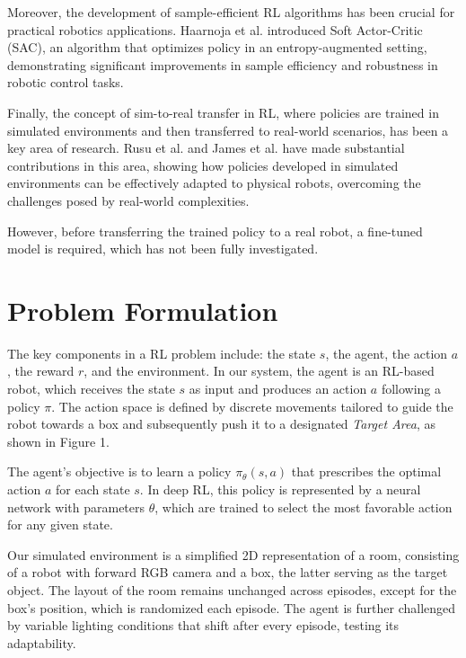 \documentclass{article}
\newcommand{\nat}[1]{\textcolor{orange}{N: #1}}
\begin{document}
Moreover, the development of sample-efficient RL algorithms has been crucial for practical robotics applications. Haarnoja et al. \cite{haarnoja2018soft} introduced Soft Actor-Critic (SAC), an algorithm that optimizes policy in an entropy-augmented setting, demonstrating significant improvements in sample efficiency and robustness in robotic control tasks.

Finally, the concept of sim-to-real transfer in RL, where policies are trained in simulated environments and then transferred to real-world scenarios, has been a key area of research. Rusu et al. \cite{rusu2017sim} and James et al. \cite{james2019sim} have made substantial contributions in this area, showing how policies developed in simulated environments can be effectively adapted to physical robots, overcoming the challenges posed by real-world complexities.

However, before transferring the trained policy to a real robot, a fine-tuned model is required, which has not been fully investigated.



\section{Problem Formulation}\label{ref:experiments}
The key components in a RL problem include: the state \( s \), the agent, the action \( a \), the reward \( r \), and  the environment. In our system, the agent is an RL-based robot, which receives the state \( s \) as input and produces an action \( a \) following a policy \( \pi \). The action space is defined by discrete movements tailored to guide the robot towards a box and subsequently push it to a designated \textit{Target Area}, as shown in Figure 1.

The agent's objective is to learn a policy \( \pi_\theta(s,a) \) that prescribes the optimal action \( a \) for each state \( s \). In deep RL, this policy is represented by a neural network with parameters \( \theta \), which are trained to select the most favorable action for any given state.

Our simulated environment is a simplified 2D representation of a room, consisting of a robot with forward RGB camera and a box, the latter serving as the target object. The layout of the room remains unchanged across episodes, except for the box's position, which is randomized each episode. The agent is further challenged by variable lighting conditions that shift after every episode, testing its adaptability.
\end{document}
